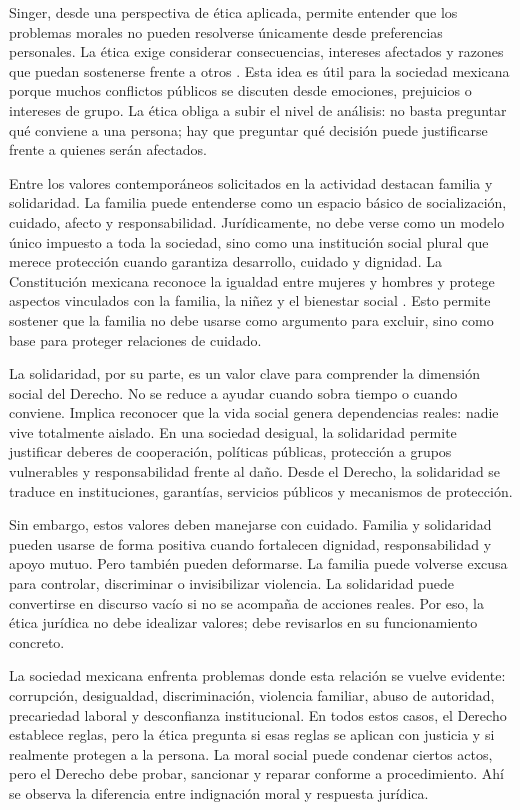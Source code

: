 \documentclass[
	spanish,
	letterpaper, oneside
]{article}
\begin{document}
Singer, desde una perspectiva de ética aplicada, permite entender que los problemas morales no pueden resolverse únicamente desde preferencias personales. La ética exige considerar consecuencias, intereses afectados y razones que puedan sostenerse frente a otros \citep{singerCompendioEtica1995}. Esta idea es útil para la sociedad mexicana porque muchos conflictos públicos se discuten desde emociones, prejuicios o intereses de grupo. La ética obliga a subir el nivel de análisis: no basta preguntar qué conviene a una persona; hay que preguntar qué decisión puede justificarse frente a quienes serán afectados.

Entre los valores contemporáneos solicitados en la actividad destacan familia y solidaridad. La familia puede entenderse como un espacio básico de socialización, cuidado, afecto y responsabilidad. Jurídicamente, no debe verse como un modelo único impuesto a toda la sociedad, sino como una institución social plural que merece protección cuando garantiza desarrollo, cuidado y dignidad. La Constitución mexicana reconoce la igualdad entre mujeres y hombres y protege aspectos vinculados con la familia, la niñez y el bienestar social \citep{constitucionCPEUM2026}. Esto permite sostener que la familia no debe usarse como argumento para excluir, sino como base para proteger relaciones de cuidado.

La solidaridad, por su parte, es un valor clave para comprender la dimensión social del Derecho. No se reduce a ayudar cuando sobra tiempo o cuando conviene. Implica reconocer que la vida social genera dependencias reales: nadie vive totalmente aislado. En una sociedad desigual, la solidaridad permite justificar deberes de cooperación, políticas públicas, protección a grupos vulnerables y responsabilidad frente al daño. Desde el Derecho, la solidaridad se traduce en instituciones, garantías, servicios públicos y mecanismos de protección.

Sin embargo, estos valores deben manejarse con cuidado. Familia y solidaridad pueden usarse de forma positiva cuando fortalecen dignidad, responsabilidad y apoyo mutuo. Pero también pueden deformarse. La familia puede volverse excusa para controlar, discriminar o invisibilizar violencia. La solidaridad puede convertirse en discurso vacío si no se acompaña de acciones reales. Por eso, la ética jurídica no debe idealizar valores; debe revisarlos en su funcionamiento concreto.

La sociedad mexicana enfrenta problemas donde esta relación se vuelve evidente: corrupción, desigualdad, discriminación, violencia familiar, abuso de autoridad, precariedad laboral y desconfianza institucional. En todos estos casos, el Derecho establece reglas, pero la ética pregunta si esas reglas se aplican con justicia y si realmente protegen a la persona. La moral social puede condenar ciertos actos, pero el Derecho debe probar, sancionar y reparar conforme a procedimiento. Ahí se observa la diferencia entre indignación moral y respuesta jurídica.
\end{document}
